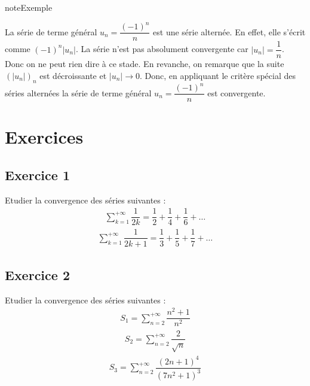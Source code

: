 \documentclass[letterpaper,10pt,french]{sphinxmanual}
\begin{document}
\begin{sphinxadmonition}{note}{Exemple}

\sphinxAtStartPar
La série de terme général \(u_n = \dfrac{(-1)^n}{n}\) est une série alternée. En effet, elle s’écrit comme \((-1)^n|u_n|\). La série n’est pas absolument convergente car \(|u_n|= \dfrac{1}{n}\). Donc on ne peut rien dire à ce stade. En revanche, on remarque que la suite \((|u_n|)_n\) est décroissante et \(|u_n| \to 0\). Donc, en appliquant le critère spécial des séries alternées la série de terme général \(u_n = \dfrac{(-1)^n}{n}\) est convergente.
\end{sphinxadmonition}


\section{Exercices}
\label{\detokenize{exo4:exercices}}\label{\detokenize{exo4::doc}}

\subsection{Exercice 1}
\label{\detokenize{exo4:exercice-1}}
\sphinxAtStartPar
Etudier la convergence des séries suivantes :
\begin{equation*}
\begin{split}
\sum_{k=1}^{+\infty} \dfrac{1}{2k} = \dfrac{1}{2} + \dfrac{1}{4}+ \dfrac{1}{6}+\ldots 
\end{split}
\end{equation*}\begin{equation*}
\begin{split}
\sum_{k=1}^{+\infty} \dfrac{1}{2k+1} = \dfrac{1}{3} + \dfrac{1}{5}+ \dfrac{1}{7}+\ldots 
\end{split}
\end{equation*}

\subsection{Exercice 2}
\label{\detokenize{exo4:exercice-2}}
\sphinxAtStartPar
Etudier la convergence des séries suivantes :
\begin{equation*}
\begin{split}
S_1 = \sum_{n=2}^{+\infty} \dfrac{n^2+1}{n^2}
\end{split}
\end{equation*}\begin{equation*}
\begin{split}
S_2 = \sum_{n=2}^{+\infty} \dfrac{2}{\sqrt{n}}
\end{split}
\end{equation*}\begin{equation*}
\begin{split}
S_3 = \sum_{n=2}^{+\infty} \dfrac{(2n+1)^4}{(7n^2+1)^3}
\end{split}
\end{equation*}
\end{document}
